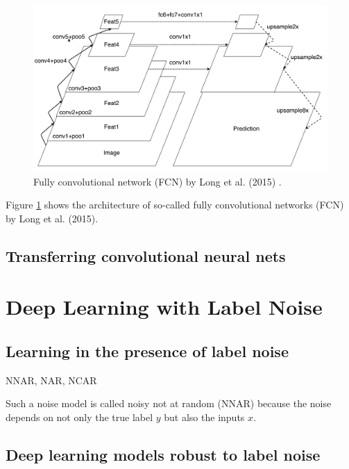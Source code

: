 
\begin{figure}[t]
\centering
   \includegraphics[width=\linewidth]{img/fcn}
\caption{Fully convolutional network (FCN) by Long et al. (2015)  \cite{long2015fully}.}
\label{fig:fcn}
\end{figure}

Figure \ref{fig:fcn} shows the architecture of so-called fully convolutional networks (FCN) by Long et al. (2015).

\subsection{Transferring convolutional neural nets}


\section{Deep Learning with Label Noise}
\subsection{Learning in the presence of label noise}

NNAR, NAR, NCAR

Such a noise model is called noisy not at random (NNAR)   \cite{frenay2014classification} because the noise depends on not only the true label $y$ but also the inputs $x$.

\subsection{Deep learning models robust to label noise}



